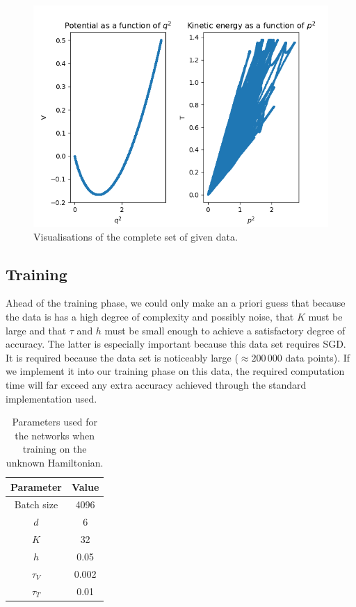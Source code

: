\documentclass{article}
\begin{document}
\begin{figure}[h]
    \centering
    \includegraphics[width=\linewidth]{givendata.png}
    \caption{Visualisations of the complete set of given data.}
    \label{fig:given_data}
\end{figure}

\subsection{Training}
Ahead of the training phase, we could only make an a priori guess that because the data is has a high degree of complexity and possibly noise, that $K$ must be large and that $\tau$ and $h$ must be small enough to achieve a satisfactory degree of accuracy. The latter is especially important because this data set requires SGD. It is required because the data set is noticeably large ($\approx 200\,000$ data points). If we implement it into our training phase on this data, the required computation time will far exceed any extra accuracy achieved through the standard implementation used.

\begin{table}[h!]
    \centering
    \begin{tabular}{c|c}
        \textbf{Parameter} & \textbf{Value} \\
        \hline
         Batch size & 4096 \\
         $d$ & 6 \\
         $K$ & 32 \\
         $h$ & 0.05 \\
         $\tau_V$ & 0.002 \\
         $\tau_T$ & 0.01 \\
    \end{tabular}
    \caption{Parameters used for the networks when training on the unknown Hamiltonian.}
    \label{tab:parameters}
\end{table}
\end{document}
